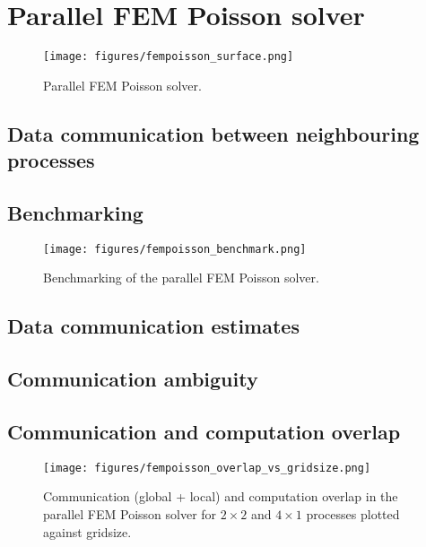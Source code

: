\section{Parallel FEM Poisson solver}
\begin{figure}[H]
    \centering
    \texttt{[image: figures/fempoisson\_surface.png]}
    \caption{Parallel FEM Poisson solver.}
    \label{fig:parallel_fem}
\end{figure}

\subsection{Data communication between neighbouring processes}

\subsection{Benchmarking}
\begin{figure}[H]
    \centering
    \texttt{[image: figures/fempoisson\_benchmark.png]}
    \caption{Benchmarking of the parallel FEM Poisson solver.}
    \label{fig:parallel_fem_benchmark}
\end{figure}
\subsection{Data communication estimates}

\subsection{Communication ambiguity}

\subsection{Communication and computation overlap}
\begin{figure}[H]
    \centering
    \texttt{[image: figures/fempoisson\_overlap\_vs\_gridsize.png]}
    \caption{
        Communication (global + local) and computation overlap in the parallel FEM Poisson solver for $2\times2$ 
        and $4\times1$ processes plotted against gridsize.}
    \label{fig:parallel_fem_overlap_gridsize}
\end{figure}

